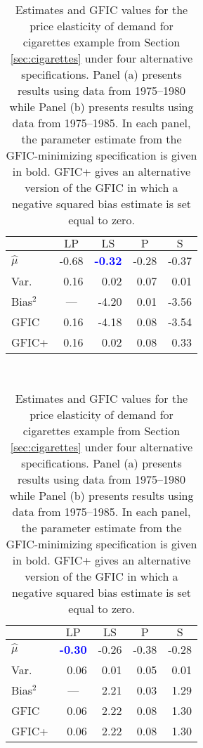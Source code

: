\begin{table}[htbp]
  \centering
    \begin{subtable}[h]{0.45\textwidth}
        \centering
     \caption{1975--1980 ($T=6$)}
     \begin{tabular}{lrrrr}\hline\hline 
         & \multicolumn{1}{c}{$\text{LP}$} & \multicolumn{1}{c}{$\text{LS}$} 
          & \multicolumn{1}{c}{$\text{P}$} & \multicolumn{1}{c}{$\text{S}$}\\
        \hline
        $\widehat{\mu}$ & -0.68 & \textcolor{blue}{\textbf{-0.32}} &  -0.28 &  -0.37\\
        Var.\ & 0.16 &  0.02 & 0.07 & 0.01\\ 
        Bias$^2$ & \multicolumn{1}{c}{---} & -4.20 & 0.01 & -3.56 \\
        GFIC  & 0.16 & -4.18 & 0.08  & -3.54  \\
        GFIC+  & 0.16 &  0.02 & 0.08  & 0.33    \\
        \hline
      \end{tabular}
    \end{subtable}
    ~
    \begin{subtable}[h]{0.45\textwidth}
      \centering
     \caption{1975--1985 ($T=11$)}
     \begin{tabular}{lrrrr}\hline\hline 
         & \multicolumn{1}{c}{$\text{LP}$} & \multicolumn{1}{c}{$\text{LS}$} 
          & \multicolumn{1}{c}{$\text{P}$} & \multicolumn{1}{c}{$\text{S}$}\\
        \hline
        $\widehat{\mu}$ & \textcolor{blue}{\textbf{-0.30}} & -0.26 &  -0.38 &  -0.28\\
        Var.\ & 0.06 & 0.01 & 0.05 & 0.01\\ 
        Bias$^2$ & \multicolumn{1}{c}{---} & 2.21 & 0.03 & 1.29\\
        GFIC  &0.06 & 2.22 & 0.08 &  1.30\\
        GFIC+  & 0.06 & 2.22 & 0.08  & 1.30  \\
           \hline
      \end{tabular}
    \end{subtable}
    \caption{Estimates and GFIC values for the price elasticity of demand for cigarettes example from Section \ref{sec:cigarettes} under four alternative specifications. Panel (a) presents results using data from 1975--1980 while Panel (b) presents results using data from 1975--1985. In each panel, the parameter estimate from the GFIC-minimizing specification is given in bold. GFIC+ gives an alternative version of the GFIC in which a negative squared bias estimate is set equal to zero.}
\end{table}


